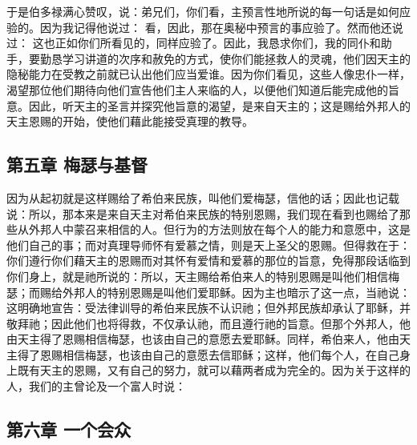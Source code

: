 于是伯多禄满心赞叹，说：弟兄们，你们看，主预言性地所说的每一句话是如何应验的。因为我记得他说过：  看，因此，那在奥秘中预言的事应验了。然而他还说过： 这也正如你们所看见的，同样应验了。因此，我恳求你们，我的同仆和助手，要勤恳学习讲道的次序和赦免的方式，使你们能拯救人的灵魂，他们因天主的隐秘能力在受教之前就已认出他们应当爱谁。因为你们看见，这些人像忠仆一样，渴望那位他们期待向他们宣告他们主人来临的人，以便他们知道后能完成他的旨意。因此，听天主的圣言并探究他旨意的渴望，是来自天主的；这是赐给外邦人的天主恩赐的开始，使他们藉此能接受真理的教导。\par


\subsection{第五章 梅瑟与基督}

因为从起初就是这样赐给了希伯来民族，叫他们爱梅瑟，信他的话；因此也记载说：所以，那本来是来自天主对希伯来民族的特别恩赐，我们现在看到也赐给了那些从外邦人中蒙召来相信的人。但行为的方法则放在每个人的能力和意愿中，这是他们自己的事；而对真理导师怀有爱慕之情，则是天上圣父的恩赐。但得救在于：你们遵行你们藉天主的恩赐而对其怀有爱情和爱慕的那位的旨意，免得那段话临到你们身上，就是祂所说的：所以，天主赐给希伯来人的特别恩赐是叫他们相信梅瑟；而赐给外邦人的特别恩赐是叫他们爱耶稣。因为主也暗示了这一点，当祂说：这明确地宣告：受法律训导的希伯来民族不认识祂；但外邦民族却承认了耶稣，并敬拜祂；因此他们也将得救，不仅承认祂，而且遵行祂的旨意。但那个外邦人，他由天主得了恩赐相信梅瑟，也该由自己的意愿去爱耶稣。同样，希伯来人，他由天主得了恩赐相信梅瑟，也该由自己的意愿去信耶稣；这样，他们每个人，在自己身上既有天主的恩赐，又有自己的努力，就可以藉两者成为完全的。因为关于这样的人，我们的主曾论及一个富人时说：\par


\subsection{第六章 一个会众}

